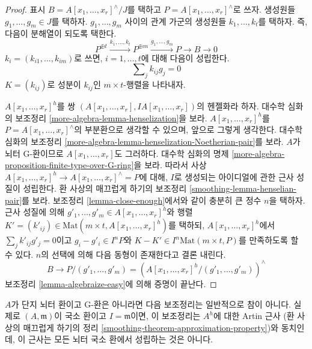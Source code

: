 \begin{proof}
표시 $B = A[x_1, \ldots, x_r]^\wedge/J$를 택하고
$P = A[x_1, \ldots, x_r]^\wedge$로 쓰자. 생성원들 $g_1, \ldots, g_m \in J$를 택하자.
$g_1, \ldots, g_m$ 사이의 관계 가군의 생성원들 $k_1, \ldots, k_t$를 택하자.
즉, 다음이 분해열이 되도록 택한다.
$$
P^{\oplus t} \xrightarrow{k_1, \ldots, k_t}
P^{\oplus m} \xrightarrow{g_1, \ldots, g_m}
P \to B \to 0
$$
$k_i = (k_{i1}, \ldots, k_{im})$로 쓰면,
$i = 1, \ldots, t$에 대해 다음이 성립한다.
\begin{equation}
\label{equation-relations-straight-up}
\sum\nolimits_j k_{ij}g_j = 0
\end{equation}
$K = (k_{ij})$로 성분이 $k_{ij}$인 $m \times t$-행렬을 나타내자.

\medskip\noindent
$A[x_1, \ldots, x_r]^h$를 쌍 $(A[x_1, \ldots, x_r], IA[x_1, \ldots, x_r])$의
헨젤화라 하자. 대수학 심화의 보조정리 \ref{more-algebra-lemma-henselization}을 보라.
$A[x_1, \ldots, x_r]^h$를 $P = A[x_1, \ldots, x_r]^\wedge$의 부분환으로 생각할 수 있으며,
앞으로 그렇게 생각한다. 대수학 심화의 보조정리
\ref{more-algebra-lemma-henselization-Noetherian-pair}를 보라.
$A$가 뇌터 G-환이므로 $A[x_1, \ldots, x_r]$도 그러하다.
대수학 심화의 명제 \ref{more-algebra-proposition-finite-type-over-G-ring}을 보라.
따라서 사상 $A[x_1, \ldots, x_r]^h \to A[x_1, \ldots, x_r]^\wedge = P$에 대해,
$I$로 생성되는 아이디얼에 관한 근사 성질이 성립한다.
환 사상의 매끄럽게 하기의 보조정리 \ref{smoothing-lemma-henselian-pair}를 보라.
보조정리 \ref{lemma-close-enough}에서와 같이 충분히 큰 정수 $n$을 택하자.
근사 성질에 의해 $g'_1, \ldots, g'_m \in A[x_1, \ldots, x_r]^h$와 행렬
$K' = (k'_{ij}) \in \text{Mat}(m \times t, A[x_1, \ldots, x_r]^h)$를 택하되,
$A[x_1, \ldots, x_r]^h$에서 $\sum\nolimits_j k'_{ij}g'_j = 0$이고
$g_i - g'_i \in I^nP$와 $K - K' \in I^n\text{Mat}(m \times t, P)$를 만족하도록 할 수 있다.
$n$의 선택에 의해 다음 동형이 존재한다고 결론 내린다.
$$
B \to P/(g'_1, \ldots, g'_m) =
\left(A[x_1, \ldots, x_r]^h/(g'_1, \ldots, g'_m)\right)^\wedge
$$
보조정리 \ref{lemma-algebraize-easy}에 의해 증명이 끝난다.
\end{proof}

\noindent
$A$가 단지 뇌터 환이고 G-환은 아니라면 다음 보조정리는 일반적으로 참이 아니다.
실제로 $(A, \mathfrak m)$이 국소 환이고 $I = \mathfrak m$이면,
이 보조정리는 $A^h$에 대한 Artin 근사
(환 사상의 매끄럽게 하기의 정리 \ref{smoothing-theorem-approximation-property})와 동치인데,
이 근사는 모든 뇌터 국소 환에서 성립하는 것은 아니다.


